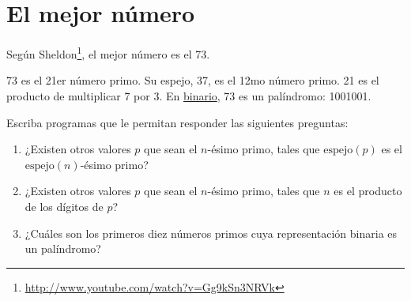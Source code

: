 \section{El mejor número}

Según Sheldon\footnote{\url{http://www.youtube.com/watch?v=Gg9kSn3NRVk}},
el mejor número es el 73.

73 es el 21er número primo. Su espejo, 37, es el 12mo número primo. 21
es el producto de multiplicar 7 por 3. En
\href{http://es.wikipedia.org/wiki/Sistema\_binario}{binario}, 73 es un
palíndromo: 1001001.

Escriba programas que le permitan responder las siguientes preguntas:
\begin{enumerate}
\item
  ¿Existen otros valores \(p\) que sean el \(n\)-ésimo primo,
  tales que \(\text{espejo}(p)\) es el \(\text{espejo}(n)\)-ésimo primo?
\item
  ¿Existen otros valores \(p\) que sean el \(n\)-ésimo primo, tales que \(n\)
  es el producto de los dígitos de \(p\)?
\item
  ¿Cuáles son los primeros diez números primos cuya representación
  binaria es un palíndromo?
\end{enumerate}
